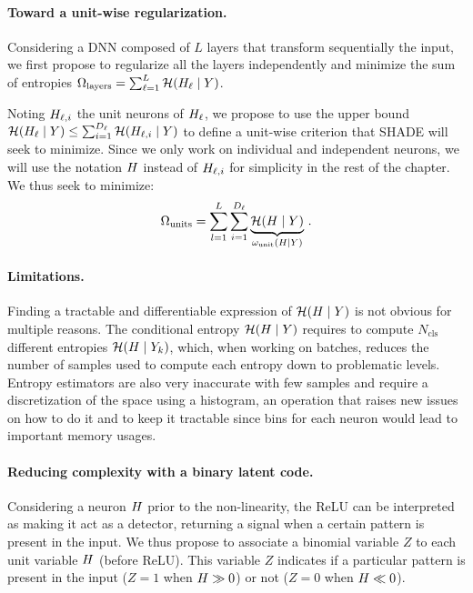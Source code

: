         \paragraph{Toward a unit-wise regularization.}
        
        Considering a \ac{DNN} composed of $L$ layers that transform sequentially the input, we first propose to regularize all the layers independently and minimize the sum of entropies $\Omega_{\mathrm{layers}} = \sum_{\ell = 1}^L \mathcal{H}(H_\ell \mid Y)$.
        
        Noting $H_{\ell,i}$ the unit neurons of $H_{\ell}$, we propose to use the  upper bound $\mathcal{H}(H_\ell \mid Y) \le \sum_{i=1}^{D_\ell} \mathcal{H}(H_{\ell,i} \mid Y)$ to define a unit-wise criterion that \ac{SHADE} will seek to minimize. Since we only work on individual and independent neurons, we will use the notation $H$ instead of $H_{\ell,i}$ for simplicity in the rest of the chapter. We thus seek to minimize:
            \begin{equation}
                \Omega_{\mathrm{units}} = \sum_{l=1}^L \sum_{i = 1}^{D_\ell} \underbrace{\mathcal{H}(H \mid Y)}_{\omega_{\mathrm{unit}}(H\mid Y)} \,.
            \end{equation}

        \paragraph{Limitations.}
        
            Finding a tractable and differentiable expression of $\mathcal{H}(H\mid Y)$ is not obvious for multiple reasons.
            The conditional entropy $\mathcal{H}(H\mid Y)$ requires to compute $N_\mathrm{cls}$ different entropies $\mathcal{H}(H\mid Y_k)$, which, when working on batches, reduces the number of samples used to compute each entropy down to problematic levels. Entropy estimators are also very inaccurate with few samples and require a discretization of the space using a histogram, an operation that raises new issues on how to do it and to keep it tractable since bins for each neuron would lead to important memory usages.
        
        \paragraph{Reducing complexity with a binary latent code.}

            Considering a neuron $H$ prior to the non-linearity, the \acs{ReLU} can be interpreted as making it act as a detector, returning a signal when a certain pattern is present in the input. We thus propose to associate a binomial variable $Z$ to each unit variable $H$ (before \acs{ReLU}). This variable $Z$ indicates if a particular pattern is present in the input ($Z=1$ when $H \gg 0$) or not ($Z=0$ when $H \ll 0$).
            
